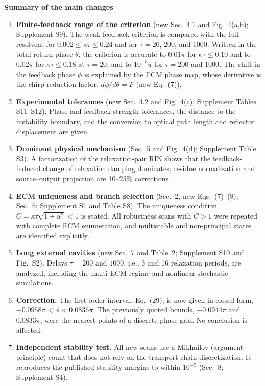 \documentclass[11pt]{article}
\begin{document}
\medskip
\noindent\textbf{Summary of the main changes}
\begin{enumerate}
\item \textbf{Finite-feedback range of the criterion} (new Sec.~4.1 and Fig.~4(a,b); Supplement S9). The weak-feedback criterion is compared with the full resolvent for $0.002\le\kappa\tau\le0.24$ and for $\tau=20$, $200$, and $1000$. Written in the total return phase $\theta$, the criterion is accurate to $0.01\pi$ for $\kappa\tau\le0.10$ and to $0.02\pi$ for $\kappa\tau\le0.18$ at $\tau=20$, and to $10^{-3}\pi$ for $\tau=200$ and $1000$. The shift in the feedback phase $\phi$ is explained by the ECM phase map, whose derivative is the chirp-reduction factor, $d\phi/d\theta=F$ (new Eq.~(7)).
\item \textbf{Experimental tolerances} (new Sec.~4.2 and Fig.~4(c); Supplement Tables S11--S12). Phase and feedback-strength tolerances, the distance to the instability boundary, and the conversion to optical path length and reflector displacement are given.
\item \textbf{Dominant physical mechanism} (Sec.~5 and Fig.~4(d); Supplement Table S3). A factorization of the relaxation-pair RIN shows that the feedback-induced change of relaxation damping dominates; residue normalization and source--output projection are 10--25\% corrections.
\item \textbf{ECM uniqueness and branch selection} (Sec.~2, new Eqs.~(7)--(8); Sec.~6; Supplement S1 and Table S8). The uniqueness condition $C=\kappa\tau\sqrt{1+\alpha^2}<1$ is stated. All robustness scans with $C>1$ were repeated with complete ECM enumeration, and multistable and non-principal states are identified explicitly.
\item \textbf{Long external cavities} (new Sec.~7 and Table~2; Supplement S10 and Fig.~S2). Delays $\tau=200$ and $1000$, i.e., 3 and 16 relaxation periods, are analyzed, including the multi-ECM regime and nonlinear stochastic simulations.
\item \textbf{Correction.} The first-order interval, Eq.~(29), is now given in closed form, $-0.0958\pi<\phi<0.0836\pi$. The previously quoted bounds, $-0.0944\pi$ and $0.0833\pi$, were the nearest points of a discrete phase grid. No conclusion is affected.
\item \textbf{Independent stability test.} All new scans use a Mikhailov (argument-principle) count that does not rely on the transport-chain discretization. It reproduces the published stability margins to within $10^{-5}$ (Sec.~8; Supplement S4).
\end{enumerate}
\end{document}
